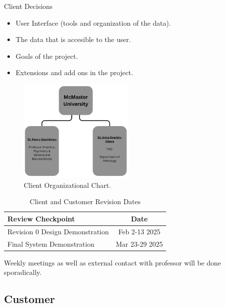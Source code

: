 \documentclass[12pt]{article}
\begin{document}
\par{Client Decisions}
\begin{itemize}
    \item User Interface (tools and organization of the data).
    \item The data that is accesible to the user.
    \item Goals of the project.
    \item Extensions and add ons in the project.
\end{itemize}

\begin{figure}[H]
    \centering
    \includegraphics[width=0.5\textwidth]{2.1 Org Chart.png}
    \caption{Client Organizational Chart.}
    \label{fig:myimage}
\end{figure}

\begin{table}[H] 
    \centering
    \caption{Client and Customer Revision Dates}
    \label{tab:my_table} 

    \begin{tabular}{|l|c|} 
        \hline 
        Review Checkpoint & Date \\ 
        \hline 
        Revision 0 Design Demonstration  & Feb 2-13 2025 \\
        \hline 
        Final System Demonstration & Mar 23-29 2025 \\
        \hline 
    \end{tabular}
\end{table}
\par{Weekly meetings as well as external contact with professor will be done sporadically.}

\subsection{Customer}
\end{document}
